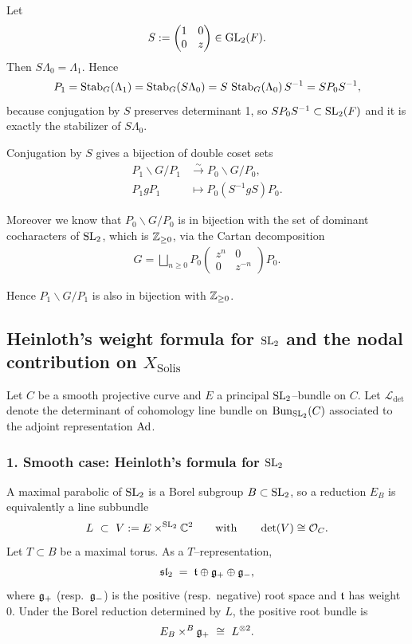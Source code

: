 \documentclass[12pt]{article}
\begin{document}
Let
\[
S:=\begin{pmatrix}1&0\\0&z\end{pmatrix}\in \operatorname{GL}_2(F).
\]
Then $S\Lambda_0=\Lambda_1$. Hence
\[
P_1=\operatorname{Stab}_G(\Lambda_1)=\operatorname{Stab}_G(S\Lambda_0)=S\,\operatorname{Stab}_G(\Lambda_0)\,S^{-1}=S P_0 S^{-1},
\]
because conjugation by $S$ preserves determinant 1, so $S P_0 S^{-1}\subset \operatorname{SL}_2(F)$ and it is exactly the stabilizer of $S\Lambda_0$.

Conjugation by $S$ gives a bijection of double coset sets
\begin{align*}
    P_1\backslash G/P_1 &\xrightarrow{\sim} P_0\backslash G/P_0,\\
    P_1 g P_1 &\mapsto P_0 (S^{-1} g S) P_0.
\end{align*}

Moreover we know that $P_0\backslash G/P_0$ is in bijection with the set of dominant cocharacters of $\operatorname{SL}_2$, which is $\mathbb{Z}_{\geq 0}$, via the Cartan decomposition \begin{align*}
    G = \bigsqcup_{n\geq 0} P_0 \begin{pmatrix} z^n & 0 \\ 0 & z^{-n} \end{pmatrix} P_0.
\end{align*}

Hence $P_1\backslash G/P_1$ is also in bijection with $\mathbb{Z}_{\geq 0}$.

\subsection{Heinloth's weight formula for $\operatorname{SL}_2$ and the nodal contribution on $X_{\mathrm{Solis}}$}

Let $C$ be a smooth projective curve and $E$ a principal $\operatorname{SL}_2$--bundle on $C$.
Let $\mathcal L_{\det}$ denote the determinant of cohomology line bundle on
$\operatorname{Bun}_{\operatorname{SL}_2}(C)$ associated to the adjoint representation $\operatorname{Ad}$.

\subsubsection*{1. Smooth case: Heinloth's formula for $\operatorname{SL}_2$}

A maximal parabolic of $\operatorname{SL}_2$ is a Borel subgroup $B\subset \operatorname{SL}_2$, so a reduction
$E_B$ is equivalently a line subbundle
\[
L\ \subset\ V:=E\times^{\SL_2}\C^2
\qquad\text{with}\qquad
\det(V)\cong\mathcal O_C.
\]
Let $T\subset B$ be a maximal torus.  As a $T$--representation,
\[
\mathfrak{sl}_2 \;=\; \mathfrak{t} \oplus \mathfrak{g}_+ \oplus \mathfrak{g}_-,
\]
where $\mathfrak{g}_+$ (resp.\ $\mathfrak{g}_-$) is the positive (resp.\ negative) root space
and $\mathfrak{t}$ has weight $0$.
Under the Borel reduction determined by $L$, the positive root bundle is
\[
E_B\times^B \mathfrak{g}_+ \ \cong\ L^{\otimes 2}.
\]
\end{document}
